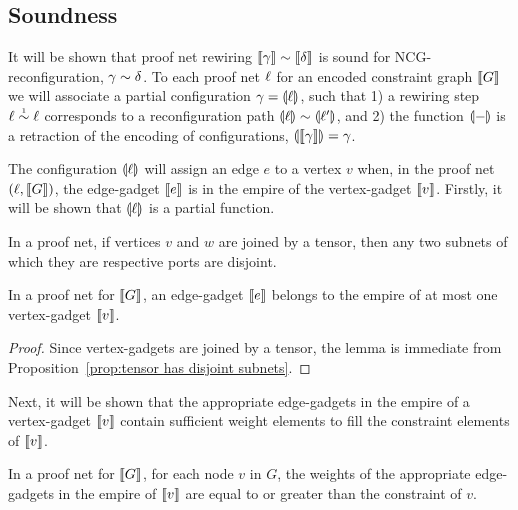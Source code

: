 \documentclass{sigplanconf}
\let\aftersubsection=\noindent
\let\capsabbrev=\uppercase
\begin{document}

\subsection*{Soundness}

\aftersubsection
It will be shown that proof net rewiring $\itn\gamma\perm\itn\delta$ is sound for \capsabbrev{ncg}-reconfiguration, $\gamma\perm\delta$.
%
To each proof net $\ell$ for an encoded constraint graph $\llbracket G\rrbracket$ we will associate a partial configuration $\gamma=\llparenthesis\ell\rrparenthesis$, such that 1) a rewiring step $\links\perm*\links$ corresponds to a reconfiguration path $\coitn\links\perm\coitn{\links'}$, and 2) the function $\llparenthesis-\rrparenthesis$ is a retraction of the encoding of configurations, $\llparenthesis\llbracket\gamma\rrbracket\rrparenthesis=\gamma$.



The configuration $\llparenthesis\ell\rrparenthesis$ will assign an edge $e$ to a vertex $v$ when, in the proof net $(\ell,\llbracket G\rrbracket)$, the edge-gadget $\llbracket e\rrbracket$ is in the empire of the vertex-gadget $\llbracket v\rrbracket$.
%
Firstly, it will be shown that $\llparenthesis\ell\rrparenthesis$ is a partial function.


\begin{proposition}
\label{prop:tensor has disjoint subnets}
In a proof net, if vertices $v$ and $w$ are joined by a tensor, then any two subnets of which they are respective ports are disjoint.
\end{proposition}


\begin{lemma}
In a proof net for $\llbracket G\rrbracket$, an edge-gadget $\llbracket e\rrbracket$ belongs to the empire of at most one vertex-gadget $\llbracket v\rrbracket$.
\end{lemma}

\begin{proof}
Since vertex-gadgets are joined by a tensor, the lemma is immediate from Proposition~\ref{prop:tensor has disjoint subnets}.
\end{proof}


Next, it will be shown that the appropriate edge-gadgets in the empire of a vertex-gadget $\llbracket v\rrbracket$ contain sufficient weight elements to fill the constraint elements of $\llbracket v\rrbracket$.


\begin{lemma}
\label{lem:appropriate edge weights}
In a proof net for $\llbracket G\rrbracket$, for each node $v$ in $G$, the weights of the appropriate edge-gadgets in the empire of $\llbracket v\rrbracket$ are equal to or greater than the constraint of $v$.
\end{lemma}
\end{document}
